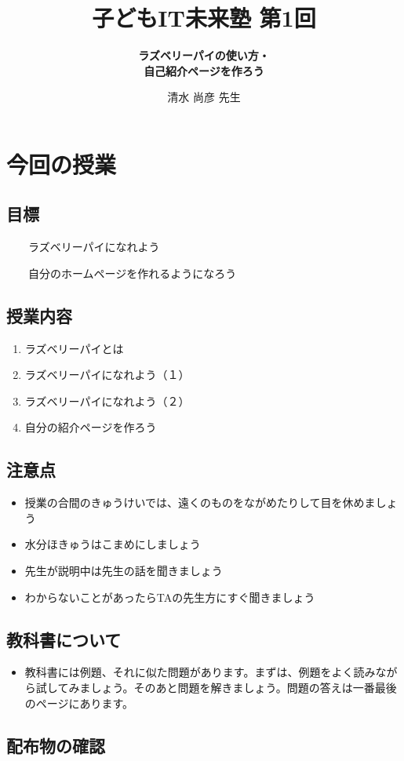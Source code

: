 \documentclass[a4paper,12pt]{jarticle}
\title{\Huge\bf 子どもIT未来塾 第1回}
\author{
\huge\bf ラズベリーパイの使い方・\\
\huge\bf 自己紹介ページを作ろう\\
\vspace{15mm}
}
\date{ \Huge 清水 尚彦 先生 }
\begin{document}
\clearpage\setcounter{page}{1}\pagestyle{Standard}
\thispagestyle{FirstPage}

\maketitle

\setcounter{page}{1}\pagestyle{Standard}
\clearpage


\section{今回の授業}
\subsection{目標}
\ \ \ \ ラズベリーパイになれよう

\ \ \ \ 自分のホームページを作れるようになろう

\subsection{授業内容}
\begin{enumerate}
\item ラズベリーパイとは
\item ラズベリーパイになれよう（１）
\item ラズベリーパイになれよう（２）
\item 自分の紹介ページを作ろう
\end{enumerate}
\subsection{注意点}
\begin{itemize}
\item
授業の合間のきゅうけいでは、遠くのものをながめたりして目を休めましょう
\item 水分ほきゅうはこまめにしましょう
\item
先生が説明中は先生の話を聞きましょう
\item
わからないことがあったらTAの先生方にすぐ聞きましょう
\end{itemize}
\subsection{教科書について}
\begin{itemize}
\item
教科書には例題、それに似た問題があります。まずは、例題をよく読みながら試してみましょう。そのあと問題を解きましょう。問題の答えは一番最後のページにあります。
\end{itemize}
\clearpage\subsection{配布物の確認}
\end{document}
